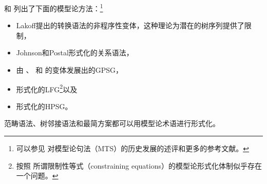  \citet[--20]{PS2001a}和 \citet{Pullum2007a}列出了下面的模型论方法：\footnote{%
可以参见 对模型论句法（MTS）的历史发展的述评和更多的参考文献。  
}
\begin{itemize}
\item Lakoff提出的转换语法的非程序性变体，这种理论为潜在的树序列提供了限制，
\item Johnson和Postal形式化的关系语法\citeyearpar{JP80a-u}，
\item 由 \citet{GPCKHL88a}、 \citet{BGM93a-u}和 \citet{Rogers97a}的变体发展出的GPSG\indexgpsgc，
\item  \citet{Kaplan95a}形式化的LFG\indexlfgc \footnote{%
 按照 \citet[\S~3.2]{Pullum2013a}所谓限制性等式（constraining equations）的模型论形式化体制似乎存在一个问题。
}以及
\item  \citet{King99a-u}形式化的HPSG\indexhpsgc 。
\end{itemize}
范畴语法\indexcgc\citep{BvN94a-u}、树邻接语法\indextagc\citep{RVS94a-u}和最简方案\indexmpc\citep{Veenstra98a}都可以用模型论术语进行形式化。

